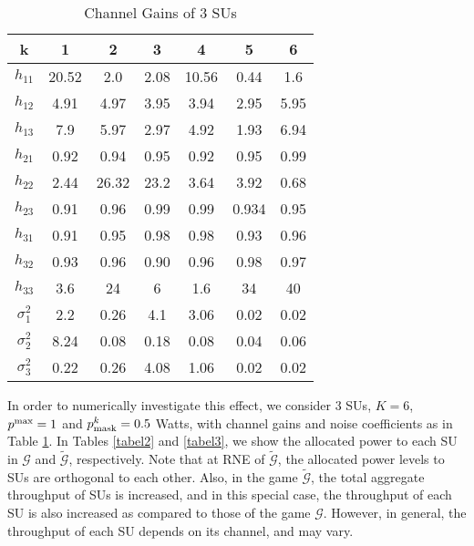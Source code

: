 \documentclass[peerreview,onecolumn,11pt,draftclsnofoot]{IEEEtran}\usepackage{amsmath}\usepackage{amsfonts}\usepackage{epsfig}\usepackage{amssymb}\usepackage{graphicx}\usepackage{amssymb,amsmath}\usepackage{cite}\usepackage{color,soul}\newcommand\T{\rule{0pt}{3.1ex}}
\begin{document}
\begin{table}[h]
\caption{Channel Gains of 3 SUs} \vspace{-.2in}\centering
\begin{tabular}{|c|c|c|c|c|c|c|}
  \hline
k & 1 & 2 & 3 & 4& 5 & 6 \\
  \hline
  $h_{11}$ & 20.52 &  2.0  &  2.08 &  10.56  &  0.44 &   1.6 \\
$h_{12}$ &   4.91  &  4.97 &   3.95 &   3.94& 2.95& 5.95\\
$h_{13}$ &  7.9  &  5.97 &   2.97  &  4.92  &  1.93 & 6.94\\
$h_{21}$ & 0.92  & 0.94  &  0.95 &   0.92   & 0.95& 0.99\\
$h_{22}$ & 2.44&  26.32&   23.2&    3.64&    3.92& 0.68 \\
$h_{23}$ & 0.91  &  0.96   & 0.99   & 0.99  &  0.934 &0.95\\
$h_{31}$ & 0.91 &  0.95&    0.98&    0.98   & 0.93& 0.96\\
$h_{32}$ & 0.93&    0.96&    0.90&    0.96&    0.98&    0.97\\
$h_{33}$&  3.6&   24&    6&    1.6&   34& 40\\
$\sigma^{2}_{1}$ &2.2&    0.26&    4.1&    3.06&    0.02& 0.02\\
$\sigma^{2}_{2}$ &    8.24&    0.08&    0.18&    0.08& 0.04&0.06\\
  $\sigma^{2}_{3}$ &  0.22&    0.26&    4.08&    1.06&    0.02&
  0.02\\
  \hline
\end{tabular}
\label{tabel1}
\end{table}

In order to numerically investigate this effect, we consider 3 SUs, $K=6$, $p^{\scriptsize{\textnormal{max}}}=1$ and $p^{k}_{\scriptsize{\textnormal{mask}}}=0.5$ Watts, with channel gains and noise coefficients as in Table \ref{tabel1}. In Tables \ref{tabel2} and \ref{tabel3}, we show the allocated power to each SU in $\mathcal{G}$ and $\widetilde{\mathcal{G}}$, respectively. Note that at RNE of $\widetilde{\mathcal{G}}$, the allocated power levels to SUs are orthogonal to each other. Also, in the game $\widetilde{\mathcal{G}}$, the total aggregate throughput of SUs is increased, and in this special case, the throughput of each SU is also increased as compared to those of the game $\mathcal{G}$. However, in general, the throughput of each SU depends on its channel, and may vary.
\end{document}
